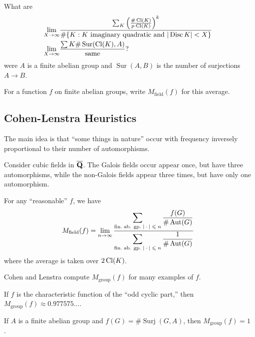 \begin{example}
What are 
\begin{align*}
  \lim_{X\to \infty} &\frac{\sum_K \left(\frac{\# \operatorname{Cl}(K)}{p\cdot \operatorname{Cl}(K)}\right)^k}{\#\{K:\text{$K$ imaginary quadratic and $|\operatorname{Disc} K|<X$}\}} \\ 
  \lim_{X\to \infty} &\frac{\sum K \#\operatorname{Sur}(\operatorname{Cl}(K), A)}{\text{same}} ?
\end{align*}
were $A$ is a finite abelian group and $\operatorname{Sur}(A,B)$ is the number 
of surjections $A\to B$. 
\end{example}

For a function $f$ on finite abelian groups, write $M_\text{field}(f)$ for this 
average. 





\subsection{Cohen-Lenstra Heuristics}

The main idea is that ``some things in nature'' occur with frequency inversely 
proportional to their number of automorphisms. 

\begin{example}
Consider cubic fields in $\overline{\mathbf{Q}}$. The Galois fields occur appear once, but 
have three automorphisms, while the non-Galois fields appear three times, but 
have only one automorphism. 
\end{example}

\begin{conjecture}[Cohen-Lenstra, Gerth for $p=2$]
For any ``reasonable'' $f$, we have 
\[
  M_\text{field}(f) = \lim_{n\to \infty}\frac{\displaystyle\sum_\text{fin.\ ab. gp.\ $|\cdot |\leqslant n$} \frac{f(G)}{\#\operatorname{Aut}(G)}}{\displaystyle\sum_\text{fin.\ ab. gp.\ $|\cdot |\leqslant n$} \frac{1}{\#\operatorname{Aut}(G)}}
\]
where the average is taken over $2\operatorname{Cl}(K)$. 
\end{conjecture}

Cohen and Lenstra compute $M_\text{group}(f)$ for many examples of $f$. 

\begin{example}
If $f$ is the characteristic function of the ``odd cyclic part,'' then 
$M_\text{group}(f)\approx 0.977575\ldots$. 
\end{example}

\begin{example}
If $A$ is a finite abelian group and $f(G)=\#\operatorname{Surj}(G,A)$, then 
$M_\text{group}(f) = 1$. 
\end{example}




